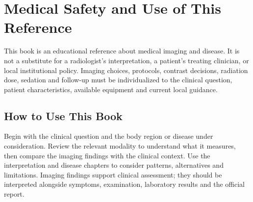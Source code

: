 \documentclass[12pt,oneside]{book}
\begin{document}
\chapter*{Medical Safety and Use of This Reference}

This book is an educational reference about medical imaging and disease. It is not a substitute for a radiologist's interpretation, a patient's treating clinician, or local institutional policy. Imaging choices, protocols, contrast decisions, radiation dose, sedation and follow-up must be individualized to the clinical question, patient characteristics, available equipment and current local guidance.

\section*{How to Use This Book}
Begin with the clinical question and the body region or disease under consideration. Review the relevant modality to understand what it measures, then compare the imaging findings with the clinical context. Use the interpretation and disease chapters to consider patterns, alternatives and limitations. Imaging findings support clinical assessment; they should be interpreted alongside symptoms, examination, laboratory results and the official report.
\end{document}
